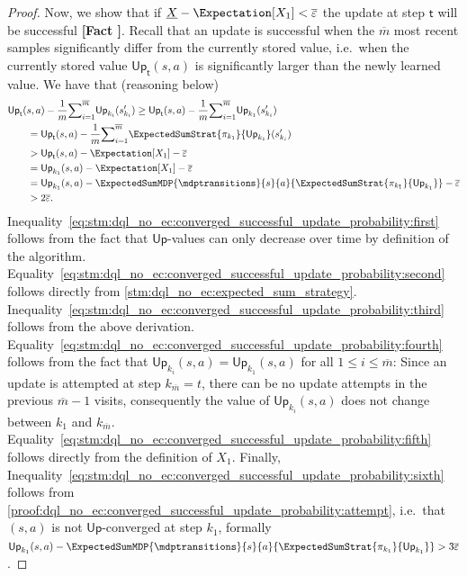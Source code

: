 \documentclass{article}
\newcommand{\strategy}{\pi}
\newcommand{\upperbound}{\mathsf{Up}}
\newcommand{\updatestep}{{\overline{\varepsilon}}}
\newcommand{\delay}{{\overline{m}}}
\newcommand{\algostep}{\mathsf{t}}
\newcounter{proofref}
\newcommand{\plabel}[1]{\refstepcounter{proofref}\label{#1}\textbf{[Fact \Roman{proofref}]}}
\begin{document}
\begin{proof}
	Now, we show that if $\underline{X} - \Expectation[X_1] < \updatestep$ the update at step $\algostep$ will be successful \plabel{proof:dql_no_ec:converged_successful_update_probability:update_success}.
	Recall that an update is successful when the $\delay$ most recent samples significantly differ from the currently stored value, i.e.\ when the currently stored value $\upperbound_\algostep(s, a)$ is significantly larger than the newly learned value.
	We have that (reasoning below)
	\begin{align}
		& \upperbound_\algostep(s, a) - \frac{1}{m} {\sum}_{i=1}^\delay \upperbound_{k_i}(s_{k_i}') \geq \upperbound_\algostep(s, a) - \frac{1}{m} {\sum}_{i=1}^\delay \upperbound_{k_1}(s_{k_i}') \label{eq:stm:dql_no_ec:converged_successful_update_probability:first} \\
			& \qquad = \upperbound_\algostep(s, a) - \frac{1}{m} {\sum}_{i=1}^\delay \ExpectedSumStrat{\strategy_{k_1}}{\upperbound_{k_1}}(s_{k_i}') \label{eq:stm:dql_no_ec:converged_successful_update_probability:second} \\
			& \qquad > \upperbound_\algostep(s, a) - \Expectation[X_1] - \updatestep \label{eq:stm:dql_no_ec:converged_successful_update_probability:third} \\
			& \qquad = \upperbound_{k_1}(s, a) - \Expectation[X_1] - \updatestep \label{eq:stm:dql_no_ec:converged_successful_update_probability:fourth} \\
			& \qquad = \upperbound_{k_1}(s, a) - \ExpectedSumMDP{\mdptransitions}{s}{a}{\ExpectedSumStrat{\strategy_{k_1}}{\upperbound_{k_1}}} - \updatestep \label{eq:stm:dql_no_ec:converged_successful_update_probability:fifth} \\
			& \qquad > 2 \updatestep. \label{eq:stm:dql_no_ec:converged_successful_update_probability:sixth}
	\end{align}
	Inequality~\eqref{eq:stm:dql_no_ec:converged_successful_update_probability:first} follows from the fact that $\upperbound$-values can only decrease over time by definition of the algorithm.
	Equality~\eqref{eq:stm:dql_no_ec:converged_successful_update_probability:second} follows directly from \cref{stm:dql_no_ec:expected_sum_strategy}.
	Inequality~\eqref{eq:stm:dql_no_ec:converged_successful_update_probability:third} follows from the above derivation.
	Equality~\eqref{eq:stm:dql_no_ec:converged_successful_update_probability:fourth} follows from the fact that $\upperbound_{k_i}(s, a) = \upperbound_{k_1}(s, a)$ for all $1 \leq i \leq \delay$:
	Since an update is attempted at step $k_\delay = t$, there can be no update attempts in the previous $\delay - 1$ visits, consequently the value of $\upperbound_{k_i}(s, a)$ does not change between $k_1$ and $k_\delay$.
	Equality~\eqref{eq:stm:dql_no_ec:converged_successful_update_probability:fifth} follows directly from the definition of $X_1$.
	Finally, Inequality~\eqref{eq:stm:dql_no_ec:converged_successful_update_probability:sixth} follows from \ref{proof:dql_no_ec:converged_successful_update_probability:attempt}, i.e.\ that $(s, a)$ is not $\upperbound$-converged at step $k_1$, formally $\upperbound_{k_1}(s, a) - \ExpectedSumMDP{\mdptransitions}{s}{a}{\ExpectedSumStrat{\strategy_{k_1}}{\upperbound_{k_1}}} > 3 \updatestep$.


\end{proof}
\end{document}
